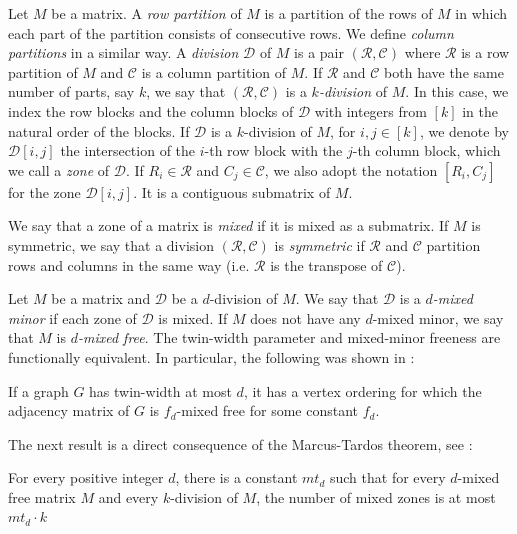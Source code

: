 \documentclass[11pt]{article}
\numberwithin{equation}{section}
\begin{document}
   Let $M$ be a matrix. 
    A \emph{row partition} of $M$ is a partition of the rows of $M$ in which each part of the partition consists of consecutive rows. We define \emph{column partitions} in a similar way. 
    A \emph{division} $\mathcal{D}$ of $M$ is a pair $(\mathcal{R}, \mathcal{C})$ where $\mathcal{R}$ is a row partition of $M$ and $\mathcal{C}$ is a column partition of $M$. If $\mathcal{R}$ and $\mathcal{C}$ both have the same number of parts, say $k$, we say that $(\mathcal{R}, \mathcal{C})$ is a \emph{$k$-division} of $M$. In this case, we index the row blocks and the column blocks of $\mathcal{D}$ with integers from $[k]$ in the natural order of the blocks. 
    If $\mathcal{D}$ is a $k$-division of $M$, for $i, j \in [k]$, we denote by $\mathcal{D}[i, j]$ the intersection of the $i$-th row block with the $j$-th column block, which we call a \emph{zone} of $\mathcal{D}$.  If $R_i\in \mathcal{R}$ and $C_j\in\mathcal{C}$, we also adopt the notation $[R_i,C_j]$ for the zone $\mathcal{D}[i, j]$. It is a contiguous submatrix of $M$. %
    
    We say that a zone of a matrix is \emph{mixed} if it is mixed as a submatrix.
    If $M$ is symmetric, we say that a division $(\mathcal{R}, \mathcal{C})$ is \emph{symmetric} if $\mathcal{R}$ and $\mathcal{C}$ partition rows and columns in the same way (i.e. $\mathcal{R}$ is the transpose of $\mathcal{C}$).
    
    Let $M$ be a matrix and $\mathcal{D}$ be a $d$-division of $M$. We say that $\mathcal{D}$ is a \emph{$d$-mixed minor} if each zone of $\mathcal{D}$ is mixed. If $M$ does not have any $d$-mixed minor, we say that $M$ is \emph{$d$-mixed free}. The twin-width parameter and mixed-minor freeness are functionally equivalent. In particular, the following was shown in \cite{BKTW21}:

    
    \begin{lemma}\label{lem:mixedtww}
    If a graph $G$ has twin-width at most $d$, it has a vertex ordering for which the adjacency matrix of $G$ is $f_d$-mixed free for some constant $f_d$.
    \end{lemma}
    

    The next result is a direct consequence of the Marcus-Tardos theorem, see \cite{MT04}:

\begin{theorem}\label{th:marcustardos}
    For every positive integer $d$, there is a constant $mt_d$ such that for every $d$-mixed free matrix $M$ and every $k$-division of $M$, the number of mixed zones is at most $mt_d \cdot k$
\end{theorem}
\end{document}
